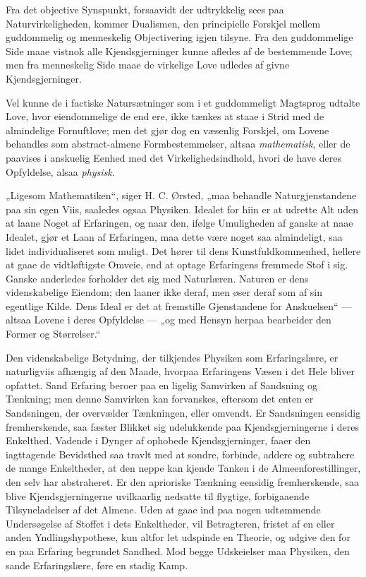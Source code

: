 \documentclass[12pt,a4paper]{book}
\begin{document}
Fra det objective Synspunkt, forsaavidt der udtrykkelig
sees paa Naturvirkeligheden, kommer Dualismen, den principielle Forskjel
mellem guddommelig og menneskelig Objectivering igjen tilsyne. Fra den
guddommelige Side maae vistnok alle Kjendsgjerninger kunne afledes af de
bestemmende Love; men fra menneskelig Side maae de virkelige Love
udledes af givne Kjendsgjerninger.

Vel kunne de i factiske Natursætninger som i et guddommeligt Magtsprog
udtalte Love, hvor eiendommelige de end ere, ikke tænkes at staae i
Strid med de almindelige Fornuftlove; men det gjør dog en væsenlig
Forskjel, om Lovene behandles som abstract-almene Formbestemmelser,
altsaa \emph{mathematisk}, eller de paavises i anskuelig Eenhed med det
Virkelighedsindhold, hvori de have deres Opfyldelse,
alsaa \emph{physisk}.

„Ligesom Mathematiken“, siger H. C. Ørsted, „maa behandle
Naturgjenstandene paa sin egen Viis, saaledes ogsaa Physiken. Idealet
for hiin er at udrette Alt uden at laane Noget af Erfaringen, og naar
den, ifølge Umuligheden af ganske at naae Idealet, gjør et Laan af
Erfaringen, maa dette være noget saa almindeligt, saa lidet
individualiseret som muligt. Det hører til dens Kunstfuldkommenhed,
hellere at gaae de vidtløftigste Omveie, end at optage Erfaringens
fremmede Stof i sig. Ganske anderledes forholder det sig med
Naturlæren. Naturen er dens videnskabelige Eiendom; den laaner ikke
deraf, men øser deraf som af sin egentlige Kilde. Dens Ideal er det at
fremstille Gjenstandene for Anskuelsen“ --- altsaa Lovene i deres
Opfyldelse --- „og med Hensyn herpaa bearbeider den Former og
Størrelser.“

Den videnskabelige Betydning, der tilkjendes Physiken som
Erfaringslære, er naturligviis afhængig af den Maade, hvorpaa
Erfaringens Væsen i det Hele bliver opfattet. Sand Erfaring beroer paa
en ligelig Samvirken af Sandsning og Tænkning; men denne Samvirken kan
forvanskes, eftersom
det enten er Sandsningen, der overvælder Tænkningen, eller
omvendt. Er Sandsningen eensidig fremherskende, saa fæster
Blikket sig udelukkende paa Kjendsgjerningerne i deres
Enkelthed. Vadende i Dynger af ophobede Kjendsgjerninger,
faaer den iagttagende Bevidsthed saa travlt med at sondre,
forbinde, addere og subtrahere de mange Enkeltheder, at den
neppe kan kjende Tanken i de Almeenforestillinger, den selv
har abstraheret. Er den aprioriske Tænkning eensidig
fremherskende, saa blive Kjendsgjerningerne uvilkaarlig nedsatte
til flygtige, forbigaaende Tilsyneladelser af det Almene. Uden
at gaae ind paa nogen udtømmende Undersøgelse af Stoffet i
dets Enkeltheder, vil Betragteren, fristet af en eller anden
Yndlingshypothese, kun altfor let udspinde en Theorie, og
udgive den for en paa Erfaring begrundet Sandhed. Mod begge
Udskeielser maa Physiken, den sande Erfaringslære, føre en
stadig Kamp.
\end{document}
